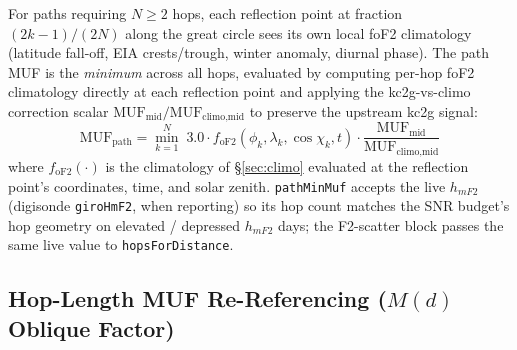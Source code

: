 \documentclass[11pt,a4paper]{article}
\begin{document}
For paths requiring $N \geq 2$ hops, each reflection point at fraction
$(2k-1)/(2N)$ along the great circle sees its own local foF2
climatology (latitude fall-off, EIA crests/trough, winter anomaly,
diurnal phase). The path MUF is the \emph{minimum} across all hops,
evaluated by computing per-hop foF2 climatology directly at each
reflection point and applying the kc2g-vs-climo correction scalar
$\text{MUF}_{\text{mid}} / \text{MUF}_{\text{climo,mid}}$ to preserve
the upstream kc2g signal:
\begin{equation}\label{eq:pathmuf}
  \text{MUF}_{\text{path}} = \min_{k=1}^{N}\;
    3.0 \cdot f_{\text{oF2}}(\phi_k, \lambda_k, \cos\chi_k, t)
    \cdot \frac{\text{MUF}_{\text{mid}}}{\text{MUF}_{\text{climo,mid}}}
\end{equation}
where $f_{\text{oF2}}(\cdot)$ is the climatology of \S\ref{sec:climo}
evaluated at the reflection point's coordinates, time, and solar
zenith.  \texttt{pathMinMuf} accepts the live $h_{m\!F2}$
(digisonde \texttt{giroHmF2}, when reporting) so its hop count
matches the SNR budget's hop geometry on elevated / depressed
$h_{m\!F2}$ days; the F2-scatter block passes the same live value
to \texttt{hopsForDistance}.

\subsection{Hop-Length MUF Re-Referencing ($M(d)$ Oblique
Factor)}\label{sec:mufoblique}
\end{document}

